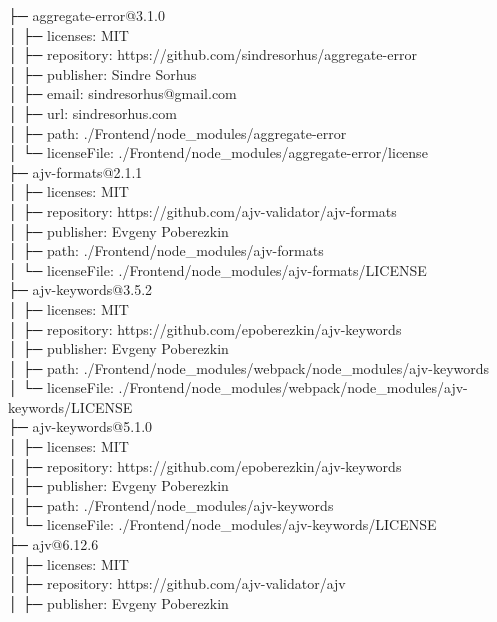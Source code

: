 \documentclass[
    paper=a4,
    twoside=false,
    parskip=half,
    listof=entryprefix,
    listof=totoc,
    index=totoc,
    bibliography=totoc,
    headsepline,
]{scrbook}
\begin{document}
    ├─ aggregate-error@3.1.0\\
    │  ├─ licenses: MIT\\
    │  ├─ repository: https://github.com/sindresorhus/aggregate-error\\
    │  ├─ publisher: Sindre Sorhus\\
    │  ├─ email: sindresorhus@gmail.com\\
    │  ├─ url: sindresorhus.com\\
    │  ├─ path: ./Frontend/node\_modules/aggregate-error\\
    │  └─ licenseFile: ./Frontend/node\_modules/aggregate-error/license\\
    ├─ ajv-formats@2.1.1\\
    │  ├─ licenses: MIT\\
    │  ├─ repository: https://github.com/ajv-validator/ajv-formats\\
    │  ├─ publisher: Evgeny Poberezkin\\
    │  ├─ path: ./Frontend/node\_modules/ajv-formats\\
    │  └─ licenseFile: ./Frontend/node\_modules/ajv-formats/LICENSE\\
    ├─ ajv-keywords@3.5.2\\
    │  ├─ licenses: MIT\\
    │  ├─ repository: https://github.com/epoberezkin/ajv-keywords\\
    │  ├─ publisher: Evgeny Poberezkin\\
    │  ├─ path: ./Frontend/node\_modules/webpack/node\_modules/ajv-keywords\\
    │  └─ licenseFile: ./Frontend/node\_modules/webpack/node\_modules/ajv-keywords/LICENSE\\
    ├─ ajv-keywords@5.1.0\\
    │  ├─ licenses: MIT\\
    │  ├─ repository: https://github.com/epoberezkin/ajv-keywords\\
    │  ├─ publisher: Evgeny Poberezkin\\
    │  ├─ path: ./Frontend/node\_modules/ajv-keywords\\
    │  └─ licenseFile: ./Frontend/node\_modules/ajv-keywords/LICENSE\\
    ├─ ajv@6.12.6\\
    │  ├─ licenses: MIT\\
    │  ├─ repository: https://github.com/ajv-validator/ajv\\
    │  ├─ publisher: Evgeny Poberezkin\\
\end{document}
